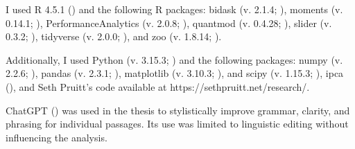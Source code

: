 \documentclass[
  12pt,
  a4paper,
  openany]{scrbook}
\begin{document}
I used R 4.5.1 () and the
following R packages: bidask (v. 2.1.4; ), moments (v. 0.14.1; ), PerformanceAnalytics (v. 2.0.8;
), quantmod
(v. 0.4.28; ), slider (v.
0.3.2; ), tidyverse (v. 2.0.0;
), and zoo (v. 1.8.14;
).

Additionally, I used Python (v. 3.15.3; ) and the following packages: numpy (v. 2.2.6;
), pandas (v. 2.3.1;
),
matplotlib (v. 3.10.3; ), and
scipy (v. 1.15.3; ), ipca (), and Seth
Pruitt's code available at https://sethpruitt.net/research/.

ChatGPT () was used in the thesis
to stylistically improve grammar, clarity, and phrasing for individual
passages. Its use was limited to linguistic editing without influencing
the analysis.


\backmatter
\end{document}

